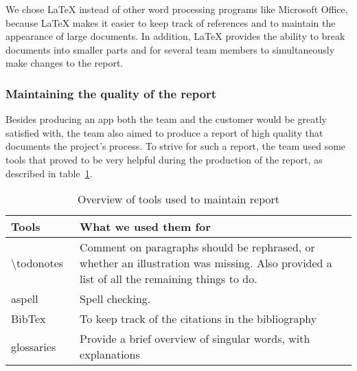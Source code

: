 We chose LaTeX instead of other word processing programs like Microsoft Office, because LaTeX makes it easier to keep track of references and to maintain the appearance of large
documents. In addition, LaTeX provides the ability to break documents into smaller parts and for several team members to simultaneously make changes to the report.

\subsubsection{Maintaining the quality of the report}
Besides producing an app both the team and the customer would be greatly satisfied with, the team also aimed to produce a report of high quality that documents the project's process. To strive for such a report, the team used some tools that proved to be very helpful during the production of the report, as described in table~\ref{tab:reportTools}.

\begin{table}[H]
\begin{tabular}{|l|p{13.7cm}|}
\hline
\textbf{Tools} & \textbf{What we used them for}\\\hline
\textbackslash todonotes~\cite{todo}&Comment on paragraphs should be rephrased, or whether an illustration was missing. Also provided a list of all the remaining things to do.\\\hline
aspell~\cite{aspell} & Spell checking.\\\hline
BibTex~\cite{bibtex}&To keep track of the citations in the bibliography\\\hline
glossaries~\cite{glossaries}& Provide a brief overview of singular words, with explanations\\\hline
\end{tabular}
\caption{Overview of tools used to maintain report}
\label{tab:reportTools}
\end{table}

